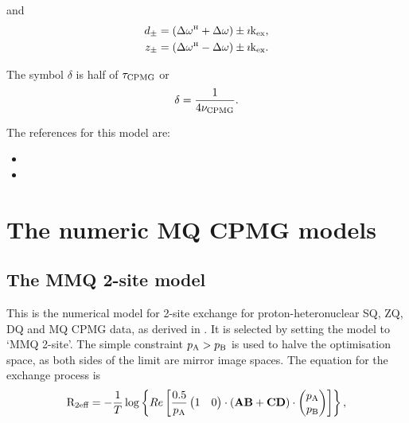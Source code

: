 and
\begin{align}
    d_\pm    &= \left( \Delta\omega^{\scriptscriptstyle\mathrm{H}} + \Delta\omega \right) \pm \imath\textrm{k}_\textrm{ex}, \\
    z_\pm    &= \left( \Delta\omega^{\scriptscriptstyle\mathrm{H}} - \Delta\omega \right) \pm \imath\textrm{k}_\textrm{ex}.
\end{align}

The symbol $\delta$ is half of $\tau_\textrm{CPMG}$ or
\begin{equation}
    \delta = \frac{1}{4\nu_\textrm{CPMG}}.
\end{equation}

The references for this model are:
\begin{itemize}
\item {}
\item {}
\end{itemize}




\section{The numeric MQ CPMG models}
\label{sect: dispersion: numeric MQ CPMG models}



\subsection{The MMQ 2-site model}
\label{sect: dispersion: MMQ 2-site model}

This is the numerical model for 2-site exchange for proton-heteronuclear SQ, ZQ, DQ and MQ CPMG data, as derived in \citep{Korzhnev04a,Korzhnev04b,Korzhnev05}.
It is selected by setting the model to `MMQ 2-site'.
The simple constraint $p_\textrm{A} > p_\textrm{B}$ is used to halve the optimisation space, as both sides of the limit are mirror image spaces.
The equation for the exchange process is 
\begin{equation}
    \mathrm{R}_\textrm{2eff} = - \frac{1}{T}
                 \log \left\{ Re \left[ \frac{0.5}{p_\textrm{A}}
                     \begin{pmatrix}1&0\end{pmatrix} \cdot \left( \mathbf{AB} + \mathbf{CD} \right) \cdot \begin{pmatrix}p_\textrm{A}\\p_\textrm{B}\end{pmatrix}
                 \right] \right\},
\end{equation}


